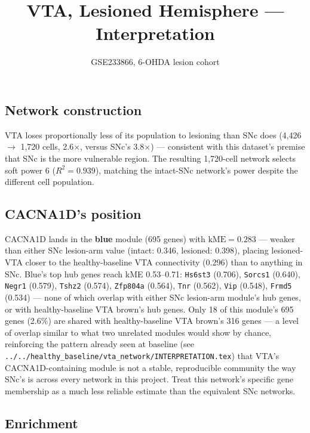 \documentclass[11pt]{article}
\title{VTA, Lesioned Hemisphere --- Interpretation}
\author{GSE233866, 6-OHDA lesion cohort}
\date{}
\begin{document}
\maketitle

\subsection*{Network construction}

VTA loses proportionally less of its population to lesioning than SNc does
(4{,}426 $\to$ 1{,}720 cells, 2.6$\times$, versus SNc's 3.8$\times$) ---
consistent with this dataset's premise that SNc is the more vulnerable
region. The resulting 1{,}720-cell network selects soft power 6
($R^2=0.939$), matching the intact-SNc network's power despite the different
cell population.

\subsection*{CACNA1D's position}

CACNA1D lands in the \textbf{blue} module (695 genes) with
$\mathrm{kME}=0.283$ --- weaker than either SNc lesion-arm value (intact:
0.346, lesioned: 0.398), placing lesioned-VTA closer to the healthy-baseline
VTA connectivity (0.296) than to anything in SNc. Blue's top hub genes reach
kME 0.53--0.71: \texttt{Hs6st3} (0.706), \texttt{Sorcs1} (0.640),
\texttt{Negr1} (0.579), \texttt{Tshz2} (0.574), \texttt{Zfp804a} (0.564),
\texttt{Tnr} (0.562), \texttt{Vip} (0.548), \texttt{Frmd5} (0.534) --- none
of which overlap with either SNc lesion-arm module's hub genes, or with
healthy-baseline VTA brown's hub genes. Only 18 of this module's 695 genes
(2.6\%) are shared with healthy-baseline VTA brown's 316 genes --- a level
of overlap similar to what two unrelated modules would show by chance,
reinforcing the pattern already seen at baseline (see
\texttt{../../healthy\_baseline/vta\_network/INTERPRETATION.tex}) that
VTA's CACNA1D-containing module is not a stable, reproducible community the
way SNc's is across every network in this project. Treat this network's
specific gene membership as a much less reliable estimate than the
equivalent SNc networks.

\subsection*{Enrichment}
\end{document}
